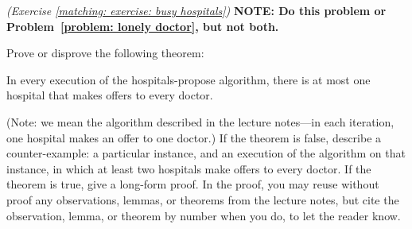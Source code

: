 \documentclass[11pt]{article}
\renewcommand{\inputAnswer}[1]{}
\begin{document}
{\small

\problem\emph{(Exercise \ref{matching: exercise: busy hospitals})}\label{problem: busy hospitals}
\textbf{NOTE: Do this problem or Problem~\ref{problem: lonely doctor}, but not both.}

Prove or disprove the following theorem:

\begin{theorem}
  In every execution of the hospitals-propose  algorithm,
  there is at most one hospital that makes offers to every doctor.
\end{theorem}

(Note: we mean the algorithm described in the lecture notes---in each iteration, one hospital makes an offer to one doctor.)
If the theorem is false, describe a counter-example:
a particular instance, and an execution of the algorithm on that instance,
in which at least two hospitals make offers to every doctor.
If the theorem is true, give a long-form proof.
In the proof, you may reuse without proof any observations, lemmas, or theorems from the lecture notes,
but cite the observation, lemma, or theorem by number when you do, to let the reader know.
}


\inputAnswer{problem_5_answer}




\end{document}
